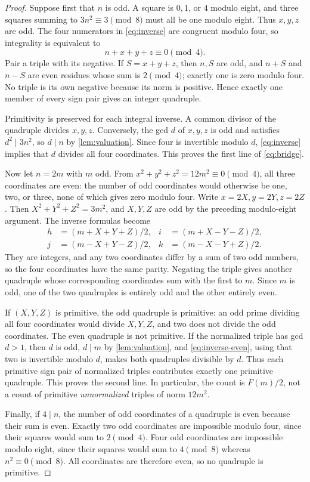 \documentclass[11pt]{article}
\theoremstyle{remark}
\begin{document}
\begin{proof}
Suppose first that $n$ is odd. A square is $0,1$, or $4$ modulo eight,
and three squares summing to $3n^2\equiv3\pmod8$ must all be one modulo
eight. Thus $x,y,z$ are odd. The four numerators in \eqref{eq:inverse} are
congruent modulo four, so integrality is equivalent to
\[
 n+x+y+z\equiv0\pmod4.
\]
Pair a triple with its negative. If $S=x+y+z$, then $n,S$ are odd, and
$n+S$ and $n-S$ are even residues whose sum is $2\pmod4$; exactly one is
zero modulo four. No triple is its own negative because its norm is positive.
Hence exactly one member of every sign pair gives an integer quadruple.

Primitivity is preserved for each integral inverse. A common divisor of the
quadruple divides $x,y,z$. Conversely, the gcd $d$ of $x,y,z$ is odd and
satisfies $d^2\mid3n^2$, so $d\mid n$ by \cref{lem:valuation}.
Since four is invertible modulo $d$, \eqref{eq:inverse} implies that $d$
divides all four coordinates. This proves the first line of \eqref{eq:bridge}.

Now let $n=2m$ with $m$ odd. From $x^2+y^2+z^2=12m^2\equiv0\pmod4$,
all three coordinates are even: the number of odd coordinates would otherwise
be one, two, or three, none of which gives zero modulo four. Write
$x=2X,y=2Y,z=2Z$. Then $X^2+Y^2+Z^2=3m^2$, and $X,Y,Z$ are odd by the
preceding modulo-eight argument. The inverse formulas become
\begin{equation}\label{eq:inverse-even}
 \begin{aligned}
 h&=(m+X+Y+Z)/2,&i&=(m+X-Y-Z)/2,\\
 j&=(m-X+Y-Z)/2,&k&=(m-X-Y+Z)/2.
 \end{aligned}
\end{equation}
They are integers, and any two coordinates differ by a sum of two odd
numbers, so the four coordinates have the same parity. Negating the triple
gives another quadruple whose corresponding coordinates sum with the first
to $m$. Since $m$ is odd, one of the two quadruples is entirely odd and the
other entirely even.

If $(X,Y,Z)$ is primitive, the odd quadruple is primitive: an odd prime
dividing all four coordinates would divide $X,Y,Z$, and two does not divide
the odd coordinates. The even quadruple is not primitive. If the normalized
triple has gcd $d>1$, then $d$ is odd, $d\mid m$ by
\cref{lem:valuation}, and \eqref{eq:inverse-even}, using that two is
invertible modulo $d$, makes both quadruples divisible by $d$.
Thus each primitive sign pair of normalized triples contributes exactly one
primitive quadruple. This proves the second line. In particular, the count
is $F(m)/2$, not a count of primitive \emph{unnormalized} triples of norm
$12m^2$.

Finally, if $4\mid n$, the number of odd coordinates of a quadruple is even
because their sum is even. Exactly two odd coordinates are impossible modulo
four, since their squares would sum to $2\pmod4$. Four odd coordinates are
impossible modulo eight, since their squares would sum to $4\pmod8$ whereas
$n^2\equiv0\pmod8$. All coordinates are therefore even, so no quadruple
is primitive.
\end{proof}
\end{document}
